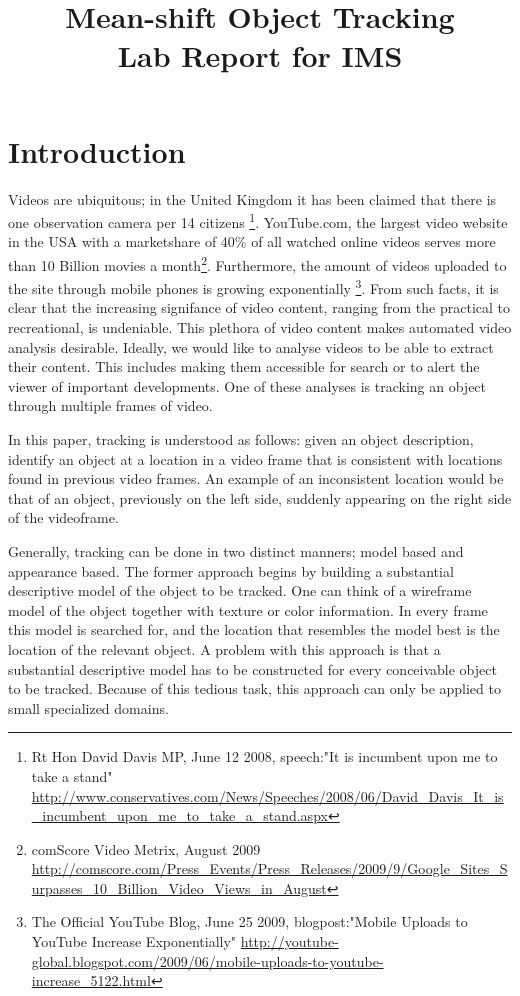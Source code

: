 \documentclass[a4paper,11pt]{article}
\title{Mean-shift Object Tracking\\ Lab Report for IMS}
\date{}
\begin{document}
\maketitle 

\section{Introduction}

Videos are ubiquitous; in the United Kingdom it has been claimed that there is one observation camera per 14 citizens \footnote{
Rt Hon David Davis MP, June 12 2008, speech:"It is incumbent upon me to take a stand" \url{http://www.conservatives.com/News/Speeches/2008/06/David_Davis_It_is_incumbent_upon_me_to_take_a_stand.aspx}}. YouTube.com, the largest video website in the USA with a marketshare of 40\% of all watched online videos serves more than 10 Billion movies a month\footnote{comScore Video Metrix, August 2009 \url{http://comscore.com/Press_Events/Press_Releases/2009/9/Google_Sites_Surpasses_10_Billion_Video_Views_in_August}}. Furthermore, the amount of videos uploaded to the site through mobile phones is growing exponentially \footnote{The Official YouTube Blog, June 25 2009, blogpost:"Mobile Uploads to YouTube Increase Exponentially"  \url{http://youtube-global.blogspot.com/2009/06/mobile-uploads-to-youtube-increase_5122.html}}. From such facts, it is clear that the increasing signifance of video content, ranging from the practical to recreational, is undeniable. This plethora of video content makes automated video analysis desirable. Ideally, we would like to analyse videos to be able to extract their content. This includes making them accessible for search or to alert the viewer of important developments. One of these analyses is tracking an object through multiple frames of video.

In this paper, tracking is understood as follows: given an object description, identify an object at a location in a video frame that is consistent with locations found in previous video frames. An example of an inconsistent location would be that of an object, previously on the left side, suddenly appearing on the right side of the videoframe. 

Generally, tracking can be done in two distinct manners; model based and appearance based. The former approach begins by building a substantial descriptive model of the object to be tracked. One can think of a wireframe model of the object together with texture or color information. In every frame this model is searched for, and the location that resembles the model best is the location of the relevant object.  A problem with this approach is that a substantial descriptive model has to be constructed for every conceivable object to be tracked.  Because of this tedious task, this approach can only be applied to small specialized domains.  
\end{document}

